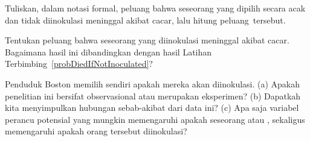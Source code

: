 
\begin{exercisewrap}
\begin{nexercise} \label{probDiedIfNotInoculated}
Tuliskan, dalam notasi formal, peluang bahwa seseorang yang dipilih secara acak dan tidak diinokulasi meninggal akibat cacar, lalu hitung \mbox{peluang tersebut.}\footnotemark
\end{nexercise}
\end{exercisewrap}

\begin{exercisewrap}
\begin{nexercise}
Tentukan peluang bahwa seseorang yang diinokulasi meninggal akibat cacar. Bagaimana hasil ini dibandingkan dengan hasil Latihan Terbimbing~\ref{probDiedIfNotInoculated}?\footnotemark
\end{nexercise}
\end{exercisewrap}

\begin{exercisewrap}
\begin{nexercise}\label{SmallpoxInoculationObsExpExercise}
Penduduk Boston memilih sendiri apakah mereka akan diinokulasi. (a) Apakah penelitian ini bersifat observasional atau merupakan eksperimen? (b) Dapatkah kita menyimpulkan hubungan sebab-akibat dari data ini? (c) Apa saja variabel perancu potensial yang mungkin memengaruhi apakah seseorang  atau , sekaligus memengaruhi apakah orang tersebut diinokulasi?\footnotemark
\end{nexercise}
\end{exercisewrap}


